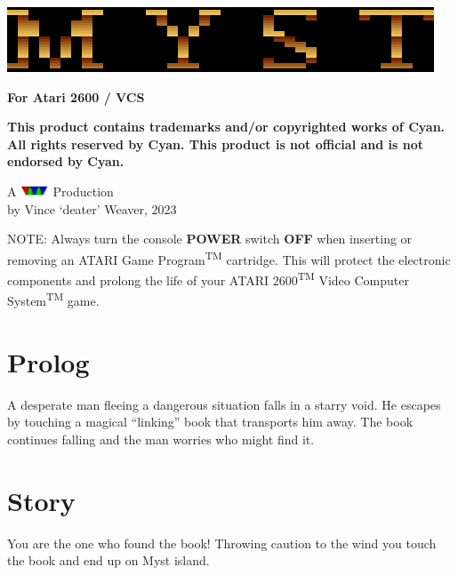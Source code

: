 \documentclass{book}
\begin{document}
\color{white}
\afterpage{\restorepagecolor}
\pagestyle{empty}

\begin{center}
\includegraphics{vcs_myst_title.png}
\end{center}

\begin{center}
{\bf For Atari 2600 / VCS}
\end{center}

\noindent
{\bf
This product contains trademarks and/or copyrighted works of Cyan.
All rights reserved by Cyan.
This product is not official and is not endorsed by Cyan. 
}

\begin{center}
A \includegraphics[width=0.33in]{vmw_logo.png} Production\\
by Vince `deater' Weaver, 2023
\end{center}

\pagebreak
\color{black}
\pagestyle{fancy}
\setcounter{page}{1}

\mbox{}
\vfill
\noindent
NOTE: Always turn the console {\bf POWER} switch {\bf OFF} when inserting
or removing an ATARI Game Program\textsuperscript{TM} cartridge.
This will protect the electronic components and prolong 
the life of your ATARI 2600\textsuperscript{TM} Video Computer
System\textsuperscript{TM} game.

\pagebreak

\section*{Prolog}
	A desperate man fleeing a dangerous situation falls
	in a starry void.  He escapes by touching a magical
	``linking'' book that transports him away.  The book
	continues falling and the man worries who might find it.
\vfill

\pagebreak

\section*{Story}
	You are the one who found the book!  Throwing caution
	to the wind you touch the book and end up on Myst island.
\end{document}
